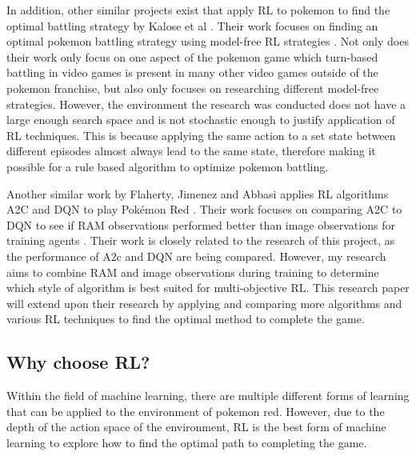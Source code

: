 In addition, other similar projects exist that apply RL to pokemon to find the optimal battling strategy by Kalose et al \cite{kalose2018optimal}. Their work focuses on finding an optimal pokemon battling strategy using model-free RL strategies \cite{kalose2018optimal}. Not only does their work only focus on one aspect of the pokemon game which turn-based battling in video games is present in many other video games outside of the pokemon franchise, but also only focuses on researching different model-free strategies. However, the environment the research was conducted does not have a large enough search space and is not stochastic enough to justify application of RL techniques. This is because applying the same action to a set state between different episodes almost always lead to the same state, therefore making it possible for a rule based algorithm to optimize pokemon battling. 

Another similar work by Flaherty, Jimenez and Abbasi applies RL algorithms A2C and DQN to play Pokémon Red  \cite{flaherty2021playing}. Their work focuses on comparing A2C to DQN to see if RAM observations performed better than image observations for training agents \cite{flaherty2021playing}. Their work is  closely related to the research of this project, as the performance of A2c and DQN are being compared. However, my research aims to combine RAM and image observations during training to determine which style of algorithm is best suited for multi-objective RL. This research paper will extend upon their research by applying and comparing more algorithms and various RL techniques to find the optimal method to complete the game.

\subsection{Why choose RL?}

Within the field of machine learning, there are multiple different forms of learning that can be applied to the environment of pokemon red. However, due to the depth of the action space of the environment, RL is the best form of machine learning to explore how to find the optimal path to completing the game. 

